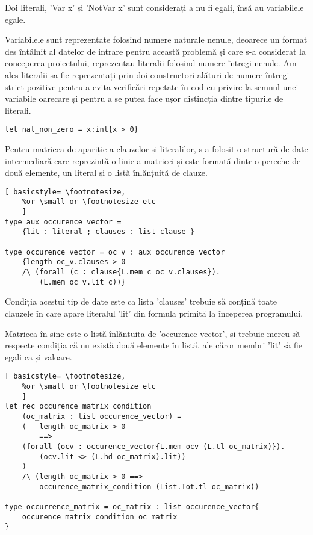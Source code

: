 Doi literali, 'Var x' și 'NotVar x' sunt considerați a nu fi egali, însă au variabilele egale.
	
Variabilele sunt reprezentate folosind numere naturale nenule, deoarece un \newline format des întâlnit al datelor de intrare pentru această problemă și care s-a considerat la conceperea proiectului, reprezentau literalii folosind numere întregi nenule. Am ales literalii sa fie reprezentați prin doi constructori alături de numere întregi strict pozitive pentru a evita verificări repetate în cod cu privire la semnul unei variabile oarecare și pentru a se putea face ușor distincția dintre tipurile de literali.

\begin{lstlisting}[]
let nat_non_zero = x:int{x > 0}
\end{lstlisting}

Pentru matricea de apariție a clauzelor și literalilor, s-a folosit o structură de date intermediară care reprezintă o linie a matricei și este formată dintr-o pereche de două \newline elemente, un literal și o listă înlănțuită de clauze.

\begin{lstlisting}[	basicstyle= \footnotesize, 
	%or \small or \footnotesize etc
	]
type aux_occurence_vector = 
	{lit : literal ; clauses : list clause }

type occurence_vector = oc_v : aux_occurence_vector
	{length oc_v.clauses > 0 
	/\ (forall (c : clause{L.mem c oc_v.clauses}). 
		(L.mem oc_v.lit c))}
\end{lstlisting}

Condiția acestui tip de date este ca lista 'clauses' trebuie să conțină toate clauzele în care apare literalul 'lit' din formula primită la începerea programului.

Matricea în sine este o listă înlănțuita de 'occurence-vector', și trebuie mereu să respecte condiția că nu există două elemente în listă, ale căror membri 'lit' să fie egali ca și valoare.

\newpage

\begin{lstlisting}[	basicstyle= \footnotesize, 
	%or \small or \footnotesize etc
	]
let rec occurence_matrix_condition 
	(oc_matrix : list occurence_vector) = 
	(   length oc_matrix > 0 
		==> 
	(forall (ocv : occurence_vector{L.mem ocv (L.tl oc_matrix)}). 
		(ocv.lit <> (L.hd oc_matrix).lit))
	)
	/\ (length oc_matrix > 0 ==> 
		occurence_matrix_condition (List.Tot.tl oc_matrix))

type occurrence_matrix = oc_matrix : list occurence_vector{
	occurence_matrix_condition oc_matrix 
}
\end{lstlisting}

